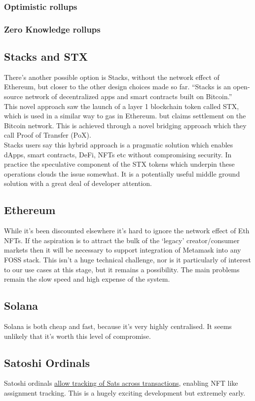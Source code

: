 \subsubsection{Optimistic rollups}
\lipsum[50]
\subsubsection{Zero Knowledge rollups}
\lipsum[50]
\subsection{Stacks and STX}
There's another possible option is Stacks, without the network effect of Ethereum, but closer to the other design choices made so far. ``Stacks is an open-source network of decentralized apps and smart contracts built on Bitcoin.''\\ 
This novel approach saw the launch of a layer 1 blockchain token called STX, which is used in a similar way to gas in Ethereum. but claims settlement on the Bitcoin network. This is achieved through a novel bridging approach which they call Proof of Transfer (PoX).\\
Stacks users say this hybrid approach is a pragmatic solution which enables dApps, smart contracts, DeFi, NFTs etc without compromising security. In practice the speculative component of the STX tokens which underpin these operations clouds the issue somewhat. It is a potentially useful middle ground solution with a great deal of developer attention.
\subsection{Ethereum}
While it's been discounted elsewhere it's hard to ignore the network effect of Eth NFTs. If the aspiration is to attract the bulk of the `legacy' creator/consumer markets then it will be necessary to support integration of Metamask into any FOSS stack. This isn't a huge technical challenge, nor is it particularly of interest to our use cases at this stage, but it remains a possibility. The main problems remain the slow speed and high expense of the system.
\subsection{Solana}
Solana is both cheap and fast, because it's very highly centralised. It seems unlikely that it's worth this level of compromise.
\subsection{Satoshi Ordinals}
Satoshi ordinals \href{https://github.com/casey/ord}{allow tracking of Sats across transactions}, enabling NFT like assignment tracking. This is a hugely exciting development but extremely early.
